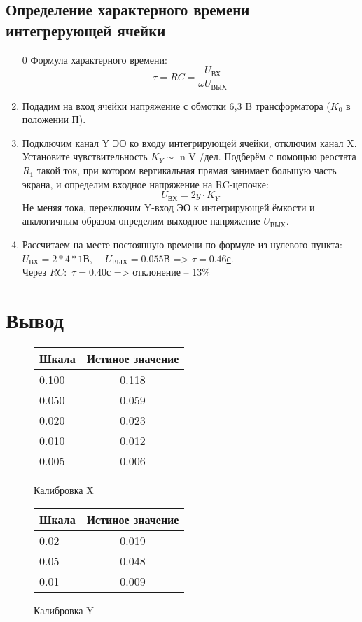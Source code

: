 \documentclass[14pt,a4paper]{article}
\begin{document}
\subsection*{Определение характерного времени интегрерующей ячейки}\begin{enumerate}
  \item[0] Формула характерного времени:
  $$\tau = RC = \frac{U_\text{ВХ}}{\omega U_\text{ВЫХ}}$$
  \item Подадим на вход ячейки
  напряжение с обмотки 6,3 B трансформатора ($K_0$ в положении П).
  \item Подключим канал Y ЭО ко входу интегрирующей ячейки, отключим канал X. Установите чувствительность $K_Y \sim$ n V /дел. Подберём с помощью реостата $R_1$ такой ток, при котором вертикальная прямая занимает
  большую часть экрана, и определим входное напряжение на RC-цепочке:
  $$U_\text{ВХ} = 2y \cdot K_Y$$
  Не меняя тока, переключим Y-вход ЭО к интегрирующей ёмкости и
  аналогичным образом определим выходное напряжение $U_\text{ВЫХ}$.
  \item  Рассчитаем на месте постоянную времени по формуле из нулевого пункта:\\
  $U_\text{ВХ} = 2 * 4 * 1$В, \ \  $U_\text{ВЫХ} = 0.055$В => \underline{$\tau = 0.46$с}.\\
  Через $RC:$ $\tau = 0.40$с => отклонение -- 13\%
\end{enumerate}

\section*{Вывод}


\begin{figure}[H]
  \centering
  \begin{tabular}{l|c}
    Шкала &Истиное значение \\
    \midrule
    0.100 &  0.118\\
    0.050 &  0.059\\
    0.020 &  0.023\\
    0.010 &  0.012\\
    0.005 &  0.006\caption{Калибровка X}
    \label{x}
  \end{tabular}
\end{figure}
\begin{figure}[H]
\begin{tabular}{l|c}
  Шкала &Истиное значение\\
  \midrule
  0.02 &  0.019 \\
  0.05 &  0.048 \\
  0.01 &  0.009\caption{Калибровка Y}\label{y}
  \end{tabular}
\end{figure}
\end{document}
